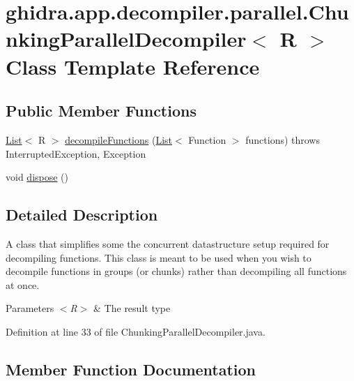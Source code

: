 \hypertarget{classghidra_1_1app_1_1decompiler_1_1parallel_1_1_chunking_parallel_decompiler}{}\section{ghidra.\+app.\+decompiler.\+parallel.\+Chunking\+Parallel\+Decompiler$<$ R $>$ Class Template Reference}
\label{classghidra_1_1app_1_1decompiler_1_1parallel_1_1_chunking_parallel_decompiler}
\subsection*{Public Member Functions}
\begin{DoxyCompactItemize}
\item 
\mbox{\hyperlink{xml_8hh_ab5ab62f46b3735557c125f91b40ac155}{List}}$<$ R $>$ \mbox{\hyperlink{classghidra_1_1app_1_1decompiler_1_1parallel_1_1_chunking_parallel_decompiler_ac760e3d948a31682f714537defee507f}{decompile\+Functions}} (\mbox{\hyperlink{xml_8hh_ab5ab62f46b3735557c125f91b40ac155}{List}}$<$ Function $>$ functions)  throws Interrupted\+Exception, 			\+Exception 
\item 
void \mbox{\hyperlink{classghidra_1_1app_1_1decompiler_1_1parallel_1_1_chunking_parallel_decompiler_a3035ca3f34788eeecfad2b5f1116d0e4}{dispose}} ()
\end{DoxyCompactItemize}


\subsection{Detailed Description}
A class that simplifies some the concurrent datastructure setup required for decompiling functions. This class is meant to be used when you wish to decompile functions in groups (or chunks) rather than decompiling all functions at once.


\begin{DoxyParams}{Parameters}
{\em $<$\+R$>$} & The result type \\
\hline
\end{DoxyParams}


Definition at line 33 of file Chunking\+Parallel\+Decompiler.\+java.



\subsection{Member Function Documentation}
\mbox{\label{classghidra_1_1app_1_1decompiler_1_1parallel_1_1_chunking_parallel_decompiler_ac760e3d948a31682f714537defee507f}} 
